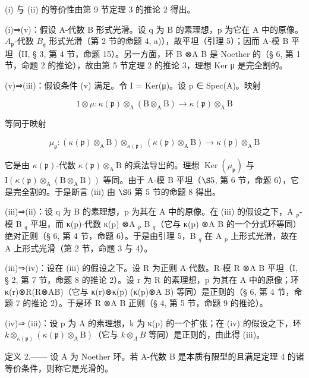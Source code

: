 (i) 与 (ii) 的等价性由第 9 节定理 3 的推论 2 得出。

(i)⇒(v)：假设 A-代数 B 形式光滑。设 q 为 B 的素理想，p 为它在 A 中的原像。\(A_{\mathfrak{p}}\)-代数 \(B_{\mathfrak{q}}\) 形式光滑（第 2 节的命题 4, a)），故平坦（引理 5）；因而 A-模 B 平坦（II, § 3, 第 4 节，命题 15）。另一方面，环 B ⊗A B 是 Noether 的（§ 6, 第 1 节，命题 2 的推论），故由第 5 节定理 2 的推论 3，理想 Ker μ 是完全割的。

(v)⇒(iii)：假设条件 (v) 满足。令 I = Ker(μ)。设 p ∈ Spec(A)。映射

\[
1 \otimes \mu : \kappa (\mathfrak {p}) \otimes_ {\mathrm{A}} (\mathrm{B} \otimes_ {\mathrm{A}} \mathrm{B}) \rightarrow \kappa (\mathfrak {p}) \otimes_ {\mathrm{A}} \mathrm{B}
\]

等同于映射

\[
\mu_ {\mathfrak {p}}: (\kappa (\mathfrak {p}) \otimes_ {\mathrm{A}} \mathrm{B}) \otimes_ {\kappa (\mathfrak {p})} (\kappa (\mathfrak {p}) \otimes_ {\mathrm{A}} \mathrm{B}) \rightarrow \kappa (\mathfrak {p}) \otimes_ {\mathrm{A}} \mathrm{B}
\]

它是由 \(\kappa(\mathfrak{p})\)-代数 \(\kappa(\mathfrak{p})\otimes_{\mathrm{A}}\mathrm{B}\) 的乘法导出的。理想 \(\operatorname{Ker}(\mu_{\mathfrak{p}})\) 与 \(\mathrm{I}(\kappa(\mathfrak{p})\otimes_{\mathrm{A}}(\mathrm{B}\otimes_{\mathrm{A}}\mathrm{B}))\) 等同。由于 A-模 B 平坦（\(\S 5\), 第 6 节，命题 6），它是完全割的。于是断言 (iii) 由 \(\S 6\) 第 5 节的命题 8 得出。

(iii)⇒(ii)：设 q 为 B 的素理想，p 为其在 A 中的原像。在 (iii) 的假设之下，A \(_{p}\)-模 B \(_{q}\) 平坦，而 κ(p)-代数 κ(p) ⊗A \(_{p}\) B \(_{q}\)（它与 κ(p) ⊗A B 的一个分式环等同）绝对正则（§ 6, 第 4 节，命题 6）。于是由引理 5，B \(_{q}\) 在 A \(_{p}\) 上形式光滑，故在 A 上形式光滑（第 2 节，命题 3 与 4）。

(iii)⇒(iv)：设在 (iii) 的假设之下。设 R 为正则 A-代数。R-模 R ⊗A B 平坦（I, § 2, 第 7 节，命题 8 的推论 2）。设 r 为 R 的素理想，p 为其在 A 中的原像；环 κ(r)⊗R(R⊗AB)（它与 κ(r)⊗κ(p) (κ(p)⊗A B) 等同）是正则的（§ 6, 第 4 节，命题 7 的推论 2）。于是环 R ⊗A B 正则（§ 4, 第 5 节，命题 9 的推论）。

(iv)⇒ (iii)：设 p 为 A 的素理想，k 为 κ(p) 的一个扩张；在 (iv) 的假设之下，环 \(k \otimes_{\kappa(\mathfrak{p})} (\kappa(\mathfrak{p}) \otimes_{\mathrm{A}} \mathrm{B})\)（它与 \(k \otimes_{A} B\) 等同）是正则的，由此得 (iii)。

定义 2.—— 设 A 为 Noether 环。若 A-代数 B 是本质有限型的且满足定理 4 的诸等价条件，则称它是光滑的。

